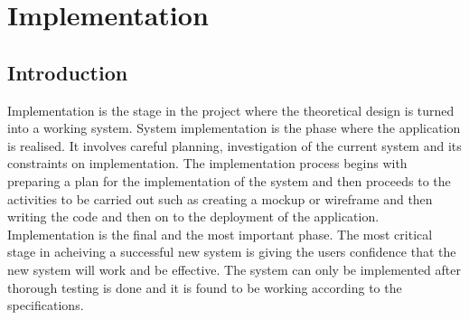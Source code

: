 \documentclass[twoside, a4paper, 12pt]{report}
\begin{document}
\chapter{Implementation}
\section{Introduction}
Implementation is the stage in the project where the theoretical design is turned into a working system. System implementation is the phase where the application is realised. It involves careful planning, investigation of the current system and its constraints on implementation. The implementation process begins with preparing a plan for the implementation of the system and then proceeds to the activities to be carried out such as creating a mockup or wireframe and then writing the code and then on to the deployment of the application.\\
\indent
Implementation is the final and the most important phase. The most critical stage in acheiving a successful new system is giving the users confidence that the new system will work and be effective. The system can only be implemented after thorough testing is done and it is found to be working according to the specifications.
\end{document}
